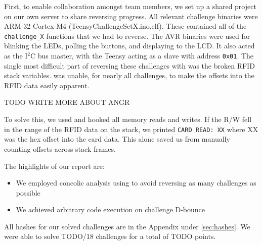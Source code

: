 First, to enable collaboration amongst team members, we set up a \ghidra shared
project on our own server to share reversing progress.
All relevant challenge binaries were ARM-32 Cortex-M4 (TeensyChallengeSetX.ino.elf).
These contained all of the \texttt{challenge\_X} functions that we had to reverse.
The AVR binaries were used for blinking the LEDs, polling the buttons, and displaying to the LCD. It also acted as the I$^{2}$C bus master, with the Teensy acting as a slave with address \texttt{0x01}.
The single most
difficult part of reversing these challenges with \ghidra was the broken RFID
stack variables. \ghidra was unable, for nearly all challenges, to make the
offsets into the RFID data easily apparent.

TODO WRITE MORE ABOUT ANGR

To solve this, we used \angr and
hooked all memory reads and writes. If the R/W fell in the range of the RFID
data on the stack, we printed \texttt{CARD READ: XX} where XX was the hex
offset into the card data. This alone saved us from manually counting offsets
across stack frames.

\vspace{0.5cm}
\noindent The highlights of our report are:
\begin{itemize}
  \item We employed concolic analysis using \angr to avoid reversing as many challenges as possible
  \item We achieved arbitrary code execution on challenge \mbox{D-bounce}
\end{itemize}

All hashes for our solved challenges are in the Appendix under \autoref{sec:hashes}.
We were able to solve TODO/18 challenges for a total of TODO points.


